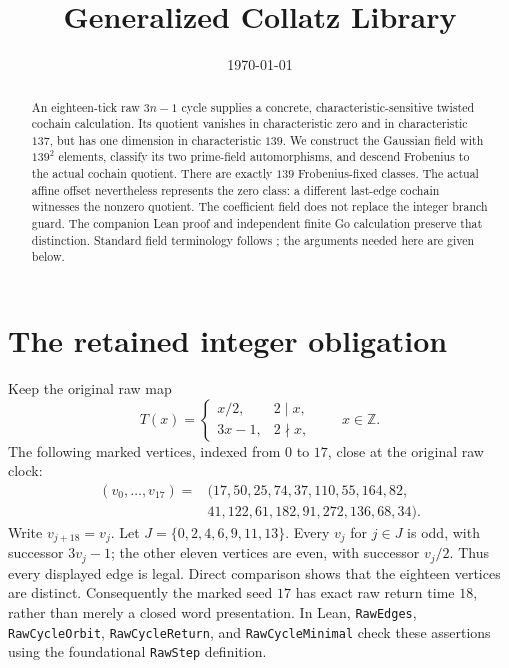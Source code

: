 \documentclass[11pt,letterpaper]{article}
\title{Generalized Collatz Library}
\author{}
\date{\today}
\newcommand{\Z}{\mathbb{Z}}
\begin{document}
\maketitle

\begin{abstract}
An eighteen-tick raw \(3n-1\) cycle supplies a concrete, characteristic-sensitive twisted cochain calculation. Its quotient vanishes in characteristic zero and in characteristic \(137\), but has one dimension in characteristic \(139\). We construct the Gaussian field with \(139^2\) elements, classify its two prime-field automorphisms, and descend Frobenius to the actual cochain quotient. There are exactly \(139\) Frobenius-fixed classes. The actual affine offset nevertheless represents the zero class: a different last-edge cochain witnesses the nonzero quotient. The coefficient field does not replace the integer branch guard. The companion Lean proof and independent finite Go calculation preserve that distinction. Standard field terminology follows \cite{Lang02}; the arguments needed here are given below.
\end{abstract}

\section{The retained integer obligation}

Keep the original raw map
\[
T(x)=\begin{cases}x/2,&2\mid x,\\3x-1,&2\nmid x,\end{cases}
\qquad x\in\Z.
\]
The following marked vertices, indexed from \(0\) to \(17\), close at the original raw clock:
\[
\begin{split}
(v_0,\ldots,v_{17})={}&(17,50,25,74,37,110,55,164,82,\allowbreak\\
&41,122,61,182,91,272,136,68,34).
\end{split}
\]
Write \(v_{j+18}=v_j\). Let \(J=\{0,2,4,6,9,11,13\}\). Every \(v_j\) for \(j\in J\) is odd, with successor \(3v_j-1\); the other eleven vertices are even, with successor \(v_j/2\). Thus every displayed edge is legal. Direct comparison shows that the eighteen vertices are distinct. Consequently the marked seed \(17\) has exact raw return time \(18\), rather than merely a closed word presentation. In Lean, \texttt{RawEdges}, \texttt{RawCycleOrbit}, \texttt{RawCycleReturn}, and \texttt{RawCycleMinimal} check these assertions using the foundational \texttt{RawStep} definition.
\end{document}
